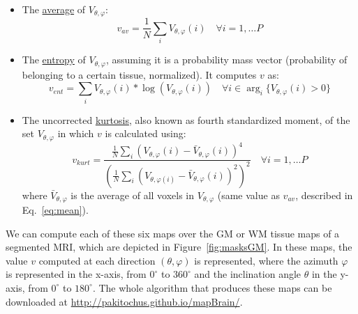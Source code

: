 \begin{itemize}
	\item The \underline{average} of $V_{\theta,\varphi}$: 
	\begin{equation}\label{eq:mean}
	v_{av}=\frac{1}{N}\sum_i V_{\theta,\varphi}(i) \quad \forall i=1,\dots P
	\end{equation}  
	
	\item The \underline{entropy} of $V_{\theta,\varphi}$, assuming it is a probability mass vector (probability of belonging to a certain tissue, normalized). It computes $v$ as:
	\begin{equation}
	v_{ent}=\sum_i V_{\theta,\varphi}(i)*\log(V_{\theta,\varphi}(i)) \quad \forall i \in \arg_i\lbrace V_{\theta,\varphi}(i)>0\rbrace
	\end{equation}
	
	\item The uncorrected \underline{kurtosis}, also known as fourth standardized moment, of the set $V_{\theta,\varphi}$ in which $v$ is calculated using:
	\begin{equation}
	v_{kurt}= \frac{\frac{1}{N}\sum_i\left(V_{\theta,\varphi}(i)-\bar{V}_{\theta,\varphi}(i)\right)^4}{\left(\frac{1}{N}\sum_i\left(V_{\theta,\varphi(i)}-\bar{V}_{\theta,\varphi}(i)\right)^2\right)^2} \quad \forall i=1,\dots P
	\end{equation}
	where $\bar{V}_{\theta,\varphi}$ is the average of all voxels in $V_{\theta,\varphi}$ (same value as $v_{av}$, described in Eq.~\ref{eq:mean}). 
	
\end{itemize}

We can compute each of these six maps over the \ac{GM} or \ac{WM} tissue maps of a segmented \ac{MRI}, which are depicted in Figure~\ref{fig:masksGM}. In these maps, the value $v$ computed at each direction $(\theta,\varphi)$ is represented, where the azimuth $\varphi$ is represented in the x-axis, from $0^{\circ}$ to $360^{\circ}$ and the inclination angle $\theta$ in the y-axis, from $0^{\circ}$ to $180^{\circ}$. The whole algorithm that produces these maps can be downloaded at \url{http://pakitochus.github.io/mapBrain/}.

